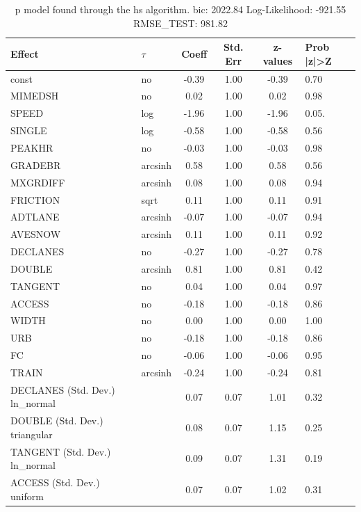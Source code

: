 \begin{table}
	\caption{p model found through the hs algorithm. bic: 2022.84 Log-Likelihood: -921.55 RMSE_TEST: 981.82}
	\begin{center}
		\begin{tabular}{|l|l|c|c|c|l|}
			\hline
			Effect & $\tau$ & Coeff & Std. Err & z-values & Prob |z|>Z \\
			\hline
			const & no & -0.39 & 1.00 & -0.39 & 0.70 \\
			\hline
			MIMEDSH & no & 0.02 & 1.00 & 0.02 & 0.98 \\
			\hline
			SPEED & log & -1.96 & 1.00 & -1.96 & 0.05. \\
			\hline
			SINGLE & log & -0.58 & 1.00 & -0.58 & 0.56 \\
			\hline
			PEAKHR & no & -0.03 & 1.00 & -0.03 & 0.98 \\
			\hline
			GRADEBR & arcsinh & 0.58 & 1.00 & 0.58 & 0.56 \\
			\hline
			MXGRDIFF & arcsinh & 0.08 & 1.00 & 0.08 & 0.94 \\
			\hline
			FRICTION & sqrt & 0.11 & 1.00 & 0.11 & 0.91 \\
			\hline
			ADTLANE & arcsinh & -0.07 & 1.00 & -0.07 & 0.94 \\
			\hline
			AVESNOW & arcsinh & 0.11 & 1.00 & 0.11 & 0.92 \\
			\hline
			DECLANES & no & -0.27 & 1.00 & -0.27 & 0.78 \\
			\hline
			DOUBLE & arcsinh & 0.81 & 1.00 & 0.81 & 0.42 \\
			\hline
			TANGENT & no & 0.04 & 1.00 & 0.04 & 0.97 \\
			\hline
			ACCESS & no & -0.18 & 1.00 & -0.18 & 0.86 \\
			\hline
			WIDTH & no & 0.00 & 1.00 & 0.00 & 1.00 \\
			\hline
			URB & no & -0.18 & 1.00 & -0.18 & 0.86 \\
			\hline
			FC & no & -0.06 & 1.00 & -0.06 & 0.95 \\
			\hline
			TRAIN & arcsinh & -0.24 & 1.00 & -0.24 & 0.81 \\
			\hline
			DECLANES (Std. Dev.) ln_normal &  & 0.07 & 0.07 & 1.01 & 0.32 \\
			\hline
			DOUBLE (Std. Dev.) triangular &  & 0.08 & 0.07 & 1.15 & 0.25 \\
			\hline
			TANGENT (Std. Dev.) ln_normal &  & 0.09 & 0.07 & 1.31 & 0.19 \\
			\hline
			ACCESS (Std. Dev.) uniform &  & 0.07 & 0.07 & 1.02 & 0.31 \\

\end{tabular}
\end{center}
\end{table}
